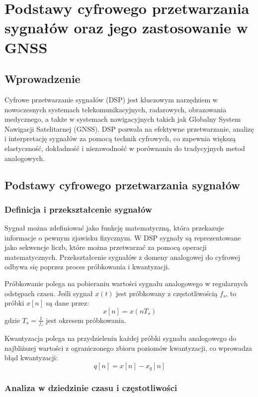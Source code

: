 \section{Podstawy cyfrowego przetwarzania sygnałów oraz jego zastosowanie w GNSS}

\subsection{Wprowadzenie}

Cyfrowe przetwarzanie sygnałów (DSP) jest kluczowym narzędziem w nowoczesnych systemach telekomunikacyjnych, radarowych, obrazowania medycznego, a także w systemach nawigacyjnych takich jak Globalny System Nawigacji Satelitarnej (GNSS). DSP pozwala na efektywne przetwarzanie, analizę i interpretację sygnałów za pomocą technik cyfrowych, co zapewnia większą elastyczność, dokładność i niezawodność w porównaniu do tradycyjnych metod analogowych.

\subsection{Podstawy cyfrowego przetwarzania sygnałów}

\subsubsection{Definicja i przekształcenie sygnałów}

Sygnał można zdefiniować jako funkcję matematyczną, która przekazuje informacje o pewnym zjawisku fizycznym. W DSP sygnały są reprezentowane jako sekwencje liczb, które można przetwarzać za pomocą operacji matematycznych. Przekształcenie sygnałów z domeny analogowej do cyfrowej odbywa się poprzez proces próbkowania i kwantyzacji.

Próbkowanie polega na pobieraniu wartości sygnału analogowego w regularnych odstępach czasu. Jeśli sygnał $x(t)$ jest próbkowany z częstotliwością $f_s$, to próbki $x[n]$ są dane przez:
\[ x[n] = x(nT_s) \]
gdzie $T_s = \frac{1}{f_s}$ jest okresem próbkowania.

Kwantyzacja polega na przydzieleniu każdej próbki sygnału analogowego do najbliższej wartości z ograniczonego zbioru poziomów kwantyzacji, co wprowadza błąd kwantyzacji:
\[ q[n] = x[n] - x_q[n] \]

\subsubsection{Analiza w dziedzinie czasu i częstotliwości}

